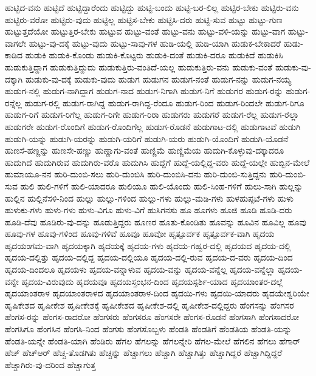 {ಹುಟ್ಟಿದ-ವನು
ಹುಟ್ಟಿದೆ
ಹುಟ್ಟಿದ್ದಾರೆಂದು
ಹುಟ್ಟಿದ್ದು
ಹುಟ್ಟಿ-ಬಂದು
ಹುಟ್ಟಿ-ಬರ-ಲಿಲ್ಲ
ಹುಟ್ಟಿರ-ಬೇಕು
ಹುಟ್ಟಿರು-ವನು
ಹುಟ್ಟಿರು-ವರೋ
ಹುಟ್ಟಿರು-ವುದು
ಹುಟ್ಟಿಲ್ಲ
ಹುಟ್ಟಿಸ-ಬೇಕು
ಹುಟ್ಟಿಸಿ-ದರು
ಹುಟ್ಟಿ-ಸುವ
ಹುಟ್ಟು
ಹುಟ್ಟು-ಗುಣ
ಹುಟ್ಟುತ್ತದೆಯೋ
ಹುಟ್ಟುತ್ತಿರ-ಬೇಕು
ಹುಟ್ಟುವ
ಹುಟ್ಟು-ವಂತೆ
ಹುಟ್ಟು-ವನು
ಹುಟ್ಟು-ವಳಿ-ಯನ್ನು
ಹುಟ್ಟು-ವಾಗ
ಹುಟ್ಟು-ವಾಗಲೇ
ಹುಟ್ಟು-ವು-ದಕ್ಕೆ
ಹುಟ್ಟು-ವುದು
ಹುಟ್ಟು-ಸಾವು-ಗಳ
ಹುಡಿ-ಯಲ್ಲಿ
ಹುಡಿ-ಯಾಗಿ
ಹುಡುಕ-ಬೇಕಾದರೆ
ಹುಡು-ಕಾಡಿದ
ಹುಡುಕಿ
ಹುಡುಕಿ-ಕೊಂಡು
ಹುಡುಕಿ-ಕೊಟ್ಟರು
ಹುಡುಕಿ-ದಂತೆ
ಹುಡುಕಿ-ದರೂ
ಹುಡುಕಿದೆ
ಹುಡುಕಿಸಿ
ಹುಡುಕುತ್ತಿದ್ದಾಗ
ಹುಡುಕುತ್ತಿದ್ದುದು
ಹುಡುಕುತ್ತಿರು-ವಂತಿದೆ-ಯಲ್ಲ
ಹುಡುಕುತ್ತಿರು-ವನು
ಹುಡುಕು-ವಂತೆ
ಹುಡುಕು-ವು-ದಕ್ಕಾಗಿ
ಹುಡುಕು-ವು-ದಕ್ಕೆ
ಹುಡುಕು-ವುದು
ಹುಡುಗ
ಹುಡುಗನ
ಹುಡುಗ-ನಂತೆ
ಹುಡುಗ-ನನ್ನು
ಹುಡುಗ-ನಯ್ಯ
ಹುಡುಗ-ನಲ್ಲಿ
ಹುಡುಗ-ನಾಗಿದ್ದಾಗ
ಹುಡುಗ-ನಾದ
ಹುಡುಗ-ನಿಗಾಗಿ
ಹುಡುಗ-ನಿಗೆ
ಹುಡುಗರ
ಹುಡುಗ-ರನ್ನು
ಹುಡುಗ-ರನ್ನೆಲ್ಲ
ಹುಡುಗ-ರಲ್ಲಿ
ಹುಡುಗ-ರಾಗಿದ್ದ
ಹುಡುಗ-ರಾಗಿದ್ದ-ರೆಂದೂ
ಹುಡುಗ-ರಿಂದ
ಹುಡುಗ-ರಿಂದಲೇ
ಹುಡುಗ-ರಿಗೂ
ಹುಡುಗ-ರಿಗೆ
ಹುಡುಗ-ರಿಗೆಲ್ಲ
ಹುಡುಗ-ರಿಗೇ
ಹುಡುಗ-ರಿರಾ
ಹುಡುಗರು
ಹುಡುಗರೆ
ಹುಡುಗ-ರೆಲ್ಲ
ಹುಡುಗ-ರೆಲ್ಲಾ
ಹುಡುಗರೇ
ಹುಡುಗ-ರೊಂದಿಗೆ
ಹುಡುಗ-ರೊಂದಿಗೆಲ್ಲ
ಹುಡುಗ-ರೊಡನೆ
ಹುಡುಗಾಟ-ದಲ್ಲಿ
ಹುಡುಗಾಟವೆ
ಹುಡುಗಿ
ಹುಡುಗಿ-ಯನ್ನು
ಹುಡುಗಿ-ಯರನ್ನು
ಹುಡುಗಿ-ಯರಿಗೆ
ಹುಡುಗಿ-ಯರು
ಹುಡುಗಿ-ಯೊಂದಿಗೆ
ಹುಡುಗಿ-ಯೊಡನೆ
ಹುಣಸೆ-ಹಣ್ಣನ್ನು
ಹುಣಸೇ-ಹಣ್ಣು
ಹುಣ್ಣಾಗು-ವಂತೆ
ಹುಣ್ಣಿಮೆ
ಹುಣ್ಣಿಮೆಯ
ಹುದುಗಿ-ಕೊಳ್ಳುವು-ದಕ್ಕಾದರೂ
ಹುದುಗಿದೆ
ಹುದುಗಿರುವ
ಹುದುಗಿರು-ವರೊ
ಹುದುಗಿಸಿ
ಹುದ್ದೆಗೆ
ಹುದ್ದೆ-ಯಲ್ಲಿದ್ದ-ವರು
ಹುದ್ದೆ-ಯಲ್ಲೇ
ಹುಬ್ಬಿನ-ಮೇಲೆ
ಹುಮಾಯೂ-ನನ
ಹುರಿ-ದುಂಬಿ-ಸಲು
ಹುರಿ-ದುಂಬಿಸಿ
ಹುರಿ-ದುಂಬಿಸಿ-ದನು
ಹುರಿ-ದುಂಬಿ-ಸುತ್ತಿದ್ದನು
ಹುರಿ-ದುಂಬಿ-ಸುವ
ಹುಲಿ
ಹುಲಿ-ಗಳಿಗೆ
ಹುಲಿ-ಯಾದರೂ
ಹುಲಿಯೂ
ಹುಲಿ-ಯೊಂದು
ಹುಲಿ-ಸಿಂಹ-ಗಳಿಗೆ
ಹುಲು-ಸಾಗಿ
ಹುಲ್ಲನ್ನು
ಹುಲ್ಲಿನ
ಹುಲ್ಲಿನೆಸಳಿ-ನಿಂದ
ಹುಲ್ಲು
ಹುಲ್ಲು-ಗಳಿಂದ
ಹುಲ್ಲು-ಗಳು
ಹುಲ್ಲು-ಮಡಿ-ಗಳು
ಹುಳಹುಪ್ಪಟೆ-ಗಳು
ಹುಳು
ಹುಳುಕು-ಗಳು
ಹುಳು-ಗಳು
ಹುಳು-ವಿಗೂ
ಹುಳು-ವಿಗೆ
ಹುಸಿಗನಸು
ಹೂ
ಹೂಗಳು
ಹೂಜಿ
ಹೂಡಿ
ಹೂಡಿ-ದರು
ಹೂಡಿ-ದೆವು
ಹೂಡಿರು-ವು-ದನ್ನು
ಹೂಡುತ್ತಿದ್ದರು
ಹೂಣರ
ಹೂತು-ಕೊಂಡಿತು
ಹೂವನ್ನು
ಹೂವಿನ
ಹೂವಿಲ್ಲ
ಹೂವು
ಹೂವು-ಗಳ
ಹೂವು-ಗಳಿಂದ
ಹೂವು-ಗಳಿವೆ
ಹೂವೂ
ಹೂವೋ
ಹೃತ್ಪೂರ್ವಕ
ಹೃತ್ಪೂರ್ವಕ-ವಾಗಿ
ಹೃದಯ
ಹೃದಯಂಗಮ-ವಾಗಿ
ಹೃದಯಕ್ಕಾಗಿ
ಹೃದಯಕ್ಕೆ
ಹೃದಯ-ಗಳು
ಹೃದಯ-ಗಹ್ವರ-ದಲ್ಲಿ
ಹೃದಯದ
ಹೃದಯ-ದಲ್ಲಿ
ಹೃದಯ-ದಲ್ಲಿತ್ತು
ಹೃದಯ-ದಲ್ಲಿದ್ದ
ಹೃದಯ-ದಲ್ಲಿಯೂ
ಹೃದಯ-ದಲ್ಲಿ-ರುವ
ಹೃದಯ-ದ-ವರು
ಹೃದಯ-ದಿಂದ
ಹೃದಯ-ದಿಂದಲೂ
ಹೃದಯಳು
ಹೃದಯ-ವನ್ನಾಳುವ
ಹೃದಯ-ವನ್ನು
ಹೃದಯ-ವನ್ನೆಲ್ಲ
ಹೃದಯ-ವನ್ನೆಲ್ಲಾ
ಹೃದಯ-ವನ್ನೇ
ಹೃದಯ-ವಿರುವುದು
ಹೃದಯವೂ
ಹೃದಯಸ್ತಂಭನ-ದಿಂದ
ಹೃದಯಸ್ಪರ್ಶಿ-ಯಾದ
ಹೃದಯಾಂತರ-ದಲ್ಲೆ
ಹೃದಯಾಂತರಾಳ
ಹೃದಯಾಂತರಾಳದ
ಹೃದಯಾಂತರಾಳ-ದಿಂದ
ಹೃದಯಿ-ಗಳು
ಹೃದಯಿ-ಯಾದರು
ಹೃದಯೇಶ್ವರಿಯೇ
ಹೃಷಿಕೇಶದ
ಹೃಷೀಕೇಶ
ಹೃಷೀಕೇಶಕ್ಕೆ
ಹೃಷೀಕೇಶದ
ಹೃಷೀಕೇಶ-ದಲ್ಲಿ
ಹೃಷೀಕೇಶ-ದಲ್ಲಿದ್ದರು
ಹೆಂಗಸನ್ನು
ಹೆಂಗಸರ
ಹೆಂಗಸ-ರನ್ನು
ಹೆಂಗಸ-ರಾದರೋ
ಹೆಂಗಸರು
ಹೆಂಗಸರೂ
ಹೆಂಗಸರೇ
ಹೆಂಗಸ-ರೊಡನೆ
ಹೆಂಗಸಾಗಿ
ಹೆಂಗಸಾದರೋ
ಹೆಂಗಸಿಗೂ
ಹೆಂಗಸಿನ
ಹೆಂಗಸಿ-ನಿಂದ
ಹೆಂಗಸು
ಹೆಂಗಸೊಬ್ಬಳು
ಹೆಂಡತಿ
ಹೆಂಡತಿಗೆ
ಹೆಂಡತಿಯ
ಹೆಂಡತಿ-ಯನ್ನು
ಹೆಂಡತಿ-ಯನ್ನೇ
ಹೆಂಡತಿ-ಯಾಗಿ
ಹೆಂಡಿರು
ಹೆಗಲ
ಹೆಗಲನ್ನು
ಹೆಗಲನ್ನೇರಿ
ಹೆಗಲ-ಮೇಲೆ
ಹೆಗಲಿನ
ಹೆಗಲು
ಹೆಗಾರ್
ಹೆಚ್
ಹೆಚ್ಆರ್
ಹೆಚ್ಚ-ತೊಡಗಿತು
ಹೆಚ್ಚನ್ನು
ಹೆಚ್ಚಾಗಲು
ಹೆಚ್ಚಾಗಿ
ಹೆಚ್ಚಾಗಿತ್ತು
ಹೆಚ್ಚಾಗಿದ್ದರೆ
ಹೆಚ್ಚಾಗಿದ್ದಿದ್ದರೆ
ಹೆಚ್ಚಾಗಿರು-ವು-ದರಿಂದ
ಹೆಚ್ಚಾಗುತ್ತ
}
